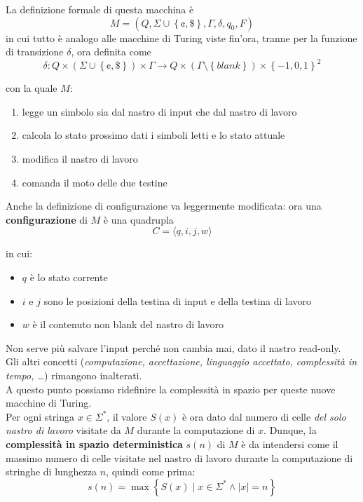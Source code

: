 La definizione formale di questa macchina è 
$$ M = \left(Q, \Sigma \cup \left\{\cent, \$\right\}, \Gamma, \delta, q_0, F \right) $$
in cui tutto è analogo alle macchine di Turing viste fin'ora, tranne per la funzione di transizione $\delta$, ora definita come
$$ \delta: Q \times \left(\Sigma \cup \left\{\cent, \$ \right\}\right) \times \Gamma \rightarrow Q \times \left(\Gamma \setminus \left\{blank\right\}\right) \times \left\{-1, 0, 1\right\}^2 $$

con la quale $M$:
\begin{enumerate}
	\item legge un simbolo sia dal nastro di input che dal nastro di lavoro
	\item calcola lo stato prossimo dati i simboli letti e lo stato attuale
	\item modifica il nastro di lavoro 
	\item comanda il moto delle due testine
\end{enumerate}

Anche la definizione di configurazione va leggermente modificata: ora una \textbf{configurazione} di $M$ è una quadrupla
$$ C = \langle q, i, j, w \rangle $$

in cui:
\begin{itemize}
	\item $q$ è lo stato corrente
	\item $i$ e $j$ sono le posizioni della testina di input e della testina di lavoro 
	\item $w$ è il contenuto non blank del nastro di lavoro
\end{itemize}

Non serve più salvare l'input perché non cambia mai, dato il nastro read-only.\\

Gli altri concetti (\textit{computazione, accettazione, linguaggio accettato, complessità in tempo, \dots}) rimangono inalterati.\\

A questo punto possiamo ridefinire la complessità in spazio per queste nuove macchine di Turing.\\

Per ogni stringa $x \in \Sigma^\ast$, il valore $S(x)$ è ora dato dal numero di celle \textit{del solo nastro di lavoro} visitate da $M$ durante la computazione di $x$. Dunque, la \textbf{complessità in spazio deterministica} $s(n)$ di $M$ è da intendersi come il massimo numero di celle visitate nel nastro di lavoro durante la computazione di stringhe di lunghezza $n$, quindi come prima: 
$$ s(n) = \max \left\{S(x) \mid x \in \Sigma^\ast \wedge |x| = n \right\} $$

